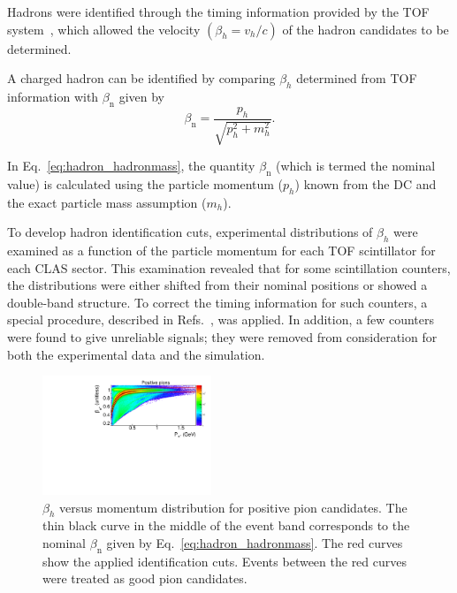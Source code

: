 \documentclass[prc,twocolumn,superscriptaddress,showpacs,amssymb,amsmath,amsfonts,aps,nofootinbib]{revtex4-1}
\begin{document}
Hadrons were identified through the timing information provided by the TOF system~\cite{Smith:1999ii, clas_tof_paddles}, which allowed the velocity $(\beta_{h} = v_{h}/c)$ of the hadron candidates to be determined.

A charged hadron can be identified by comparing $\beta_{h}$ determined from TOF information with $\beta_{\text{n}}$ given by 
\begin{equation}
\beta_{\text{n}}=\frac{p_{h}}{\sqrt{p_{h}^{2}+m_{h}^{2}}}.
\label{eq:hadron_hadronmass}
\end{equation}

In Eq.\!~\eqref{eq:hadron_hadronmass}, the quantity $\beta_{\text{n}}$ (which is termed the nominal value) is calculated using the particle momentum ($p_{h}$) known from the DC and the exact particle mass assumption ($m_{h}$).


To develop hadron identification cuts, experimental distributions of $\beta_{h}$ were examined as a function of the particle momentum for each TOF scintillator for each CLAS sector. This examination revealed that for some scintillation counters, the distributions were either shifted from their nominal positions or showed a double-band structure. To correct the timing information for such counters, a special procedure, described in Refs.\!~\cite{my_an_note:2020, my_thesis:2021}, was applied. In addition, a few counters were found to give unreliable signals; they were removed from consideration for both the experimental data and the simulation.

\begin{figure}[htp]
\begin{center}
 \includegraphics[width=0.45\textwidth,keepaspectratio]{pictures/event_selection/hadron_id_cuts.pdf}
\caption{$\beta_{h}$ versus momentum distribution for positive pion candidates. The thin black curve in the middle of the event band corresponds to the nominal $\beta_{\text{n}}$ given by Eq.\!~\eqref{eq:hadron_hadronmass}. The red curves show the applied identification cuts. Events between the red curves were treated as good pion candidates. }
\label{fig:hadron_id}
\end{center}
\end{figure}
\end{document}
